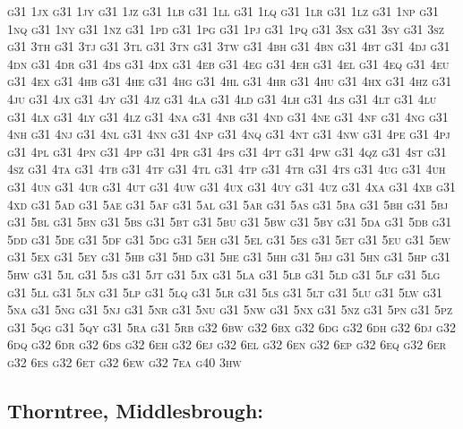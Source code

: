 \documentclass[12pt,a4paper]{article}
\begin{document}
\textsc{\lowercase{%
G31 1JX	G31 1JY	G31 1JZ	G31 1LB	G31 1LL	G31 1LQ
G31 1LR	G31 1LZ	G31 1NP	G31 1NQ	G31 1NY	G31 1NZ
G31 1PD	G31 1PG	G31 1PJ	G31 1PQ	G31 3SX	G31 3SY
G31 3SZ	G31 3TH	G31 3TJ	G31 3TL	G31 3TN	G31 3TW
G31 4BH	G31 4BN	G31 4BT	G31 4DJ	G31 4DN	G31 4DR
G31 4DS	G31 4DX	G31 4EB	G31 4EG	G31 4EH	G31 4EL
G31 4EQ	G31 4EU	G31 4EX	G31 4HB	G31 4HE	G31 4HG
G31 4HL	G31 4HR	G31 4HU	G31 4HX	G31 4HZ	G31 4JU
G31 4JX	G31 4JY	G31 4JZ	G31 4LA	G31 4LD	G31 4LH
G31 4LS	G31 4LT	G31 4LU	G31 4LX	G31 4LY	G31 4LZ
G31 4NA	G31 4NB	G31 4ND	G31 4NE	G31 4NF	G31 4NG
G31 4NH	G31 4NJ	G31 4NL	G31 4NN	G31 4NP	G31 4NQ
G31 4NT	G31 4NW	G31 4PE	G31 4PJ	G31 4PL	G31 4PN
G31 4PP	G31 4PR	G31 4PS	G31 4PT	G31 4PW	G31 4QZ
G31 4ST	G31 4SZ	G31 4TA	G31 4TB	G31 4TF	G31 4TL
G31 4TP	G31 4TR	G31 4TS	G31 4UG	G31 4UH	G31 4UN
G31 4UR	G31 4UT	G31 4UW	G31 4UX	G31 4UY	G31 4UZ
G31 4XA	G31 4XB	G31 4XD	G31 5AD	G31 5AE	G31 5AF
G31 5AL	G31 5AR	G31 5AS	G31 5BA	G31 5BH	G31 5BJ
G31 5BL	G31 5BN	G31 5BS	G31 5BT	G31 5BU	G31 5BW
G31 5BY	G31 5DA	G31 5DB	G31 5DD	G31 5DE	G31 5DF
G31 5DG	G31 5EH	G31 5EL	G31 5ES	G31 5ET	G31 5EU
G31 5EW	G31 5EX	G31 5EY	G31 5HB	G31 5HD	G31 5HE
G31 5HH	G31 5HJ	G31 5HN	G31 5HP	G31 5HW	G31 5JL
G31 5JS	G31 5JT	G31 5JX	G31 5LA	G31 5LB	G31 5LD
G31 5LF	G31 5LG	G31 5LL	G31 5LN	G31 5LP	G31 5LQ
G31 5LR	G31 5LS	G31 5LT	G31 5LU	G31 5LW	G31 5NA
G31 5NG	G31 5NJ	G31 5NR	G31 5NU	G31 5NW	G31 5NX
G31 5NZ	G31 5PN	G31 5PZ	G31 5QG	G31 5QY	G31 5RA
G31 5RB	G32 6BW	G32 6BX	G32 6DG	G32 6DH	G32 6DJ
G32 6DQ	G32 6DR	G32 6DS	G32 6EH	G32 6EJ	G32 6EL
G32 6EN	G32 6EP	G32 6EQ	G32 6ER	G32 6ES	G32 6ET
G32 6EW	G32 7EA	G40 3HW			
}}

\subsection*{Thorntree, Middlesbrough:}
\end{document}
